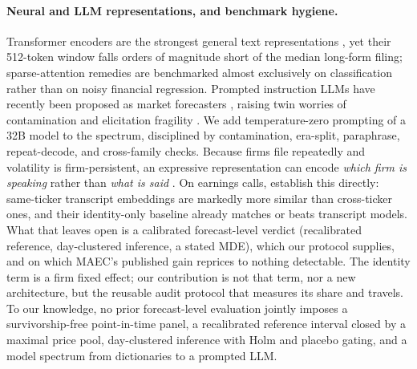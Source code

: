 \paragraph{Neural and LLM representations, and benchmark hygiene.}
Transformer encoders are the strongest general text representations \citep{devlin2019bert,liu2019roberta}, yet their 512-token window falls orders of magnitude short of the median long-form filing; sparse-attention remedies \citep{beltagy2020longformer} are benchmarked almost exclusively on classification rather than on noisy financial regression. Prompted instruction LLMs have recently been proposed as market forecasters \citep{lopezlira2023chatgpt}, raising twin worries of contamination and elicitation fragility \citep{sainz2023contamination}. We add temperature-zero prompting of a 32B model \citep{qwen3_2025} to the spectrum, disciplined by contamination, era-split, paraphrase, repeat-decode, and cross-family checks. Because firms file repeatedly and volatility is firm-persistent, an expressive representation can encode \emph{which firm is speaking} rather than \emph{what is said} \citep{geirhos2020shortcut}. On earnings calls, \citet{yu2025samecompany} establish this directly: same-ticker transcript embeddings are markedly more similar than cross-ticker ones, and their identity-only baseline already matches or beats transcript models. What that leaves open is a calibrated forecast-level verdict (recalibrated reference, day-clustered inference, a stated MDE), which our protocol supplies, and on which MAEC's published gain reprices to nothing detectable. The identity term is a firm fixed effect; our contribution is not that term, nor a new architecture, but the reusable audit protocol that measures its share and travels. To our knowledge, no prior forecast-level evaluation jointly imposes a survivorship-free point-in-time panel, a recalibrated reference interval closed by a maximal price pool, day-clustered inference with Holm and placebo gating, and a model spectrum from dictionaries to a prompted LLM.
